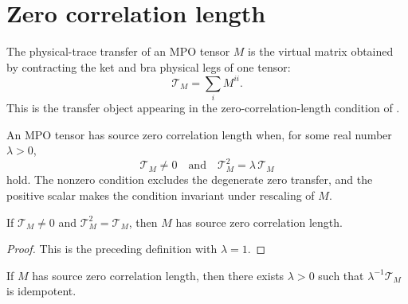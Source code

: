 \section{Zero correlation length}

\begin{definition}
    \label{def:mpo_physical_trace_transfer}
    \leanok
    The physical-trace transfer of an MPO tensor $M$ is the virtual matrix
    obtained by contracting the ket and bra physical legs of one tensor:
    \[
        \mathcal T_M=\sum_i M^{ii}.
    \]
    This is the transfer object appearing in the zero-correlation-length
    condition of \cite[Definition~4.2, lines~736--741]{Cirac2016MPDO_arXiv}.
\end{definition}

\begin{definition}
    \label{def:mpo_source_zcl}
    \leanok
    An MPO tensor has source zero correlation length when, for some real number
    $\lambda>0$,
    \[
        \mathcal T_M\ne 0
        \quad\text{and}\quad
        \mathcal T_M^2=\lambda\,\mathcal T_M
    \]
    hold. The nonzero condition excludes the degenerate zero transfer, and the
    positive scalar makes the condition invariant under rescaling of $M$.
\end{definition}

\begin{theorem}
    \label{thm:mpo_source_zcl_of_physical_trace_idempotent}
    \leanok
    If $\mathcal T_M\ne0$ and $\mathcal T_M^2=\mathcal T_M$, then $M$ has
    source zero correlation length.
\end{theorem}

\begin{proof}
    \leanok
    This is the preceding definition with $\lambda=1$.
\end{proof}

\begin{lemma}
    \label{lem:mpo_source_zcl_normalized_idempotent}
    \leanok
    If $M$ has source zero correlation length, then there exists $\lambda>0$
    such that $\lambda^{-1}\mathcal T_M$ is idempotent.
\end{lemma}

